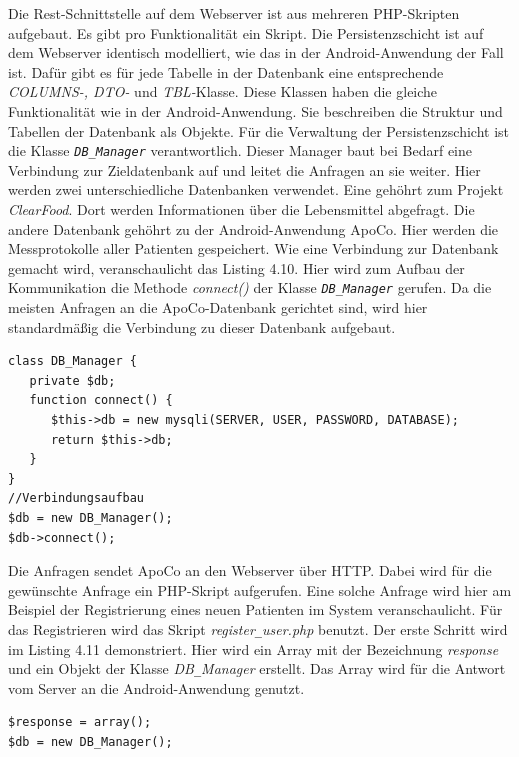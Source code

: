 Die Rest-Schnittstelle auf dem Webserver ist aus mehreren PHP-Skripten aufgebaut.
Es gibt pro Funktionalit\"at ein Skript.
Die Persistenzschicht ist auf dem Webserver identisch modelliert, wie das in der Android-Anwendung der Fall ist.
Daf\"ur gibt es f\"ur jede Tabelle in der Datenbank eine entsprechende \emph{COLUMNS-, DTO-} und \emph{TBL-}Klasse.
Diese Klassen haben die gleiche Funktionalit\"at wie in der Android-Anwendung.
Sie beschreiben die Struktur und Tabellen der Datenbank als Objekte.
F\"ur die Verwaltung der Persistenzschicht ist die Klasse \emph{\texttt{DB\_Manager}} verantwortlich.
Dieser Manager baut bei Bedarf eine Verbindung zur Zieldatenbank auf und leitet die Anfragen an sie weiter.
Hier werden zwei unterschiedliche Datenbanken verwendet.
Eine geh\"ohrt zum Projekt \emph{ClearFood}.
Dort werden Informationen \"uber die Lebensmittel abgefragt.
Die andere Datenbank geh\"ohrt zu der Android-Anwendung ApoCo.
Hier werden die Messprotokolle aller Patienten gespeichert.
Wie eine Verbindung zur Datenbank gemacht wird, veranschaulicht das Listing 4.10.
Hier wird zum Aufbau der Kommunikation die Methode \emph{connect()} der Klasse \emph{\texttt{DB\_Manager}} gerufen.
Da die meisten Anfragen an die ApoCo-Datenbank gerichtet sind, 
wird hier standardm\"a\ss{}ig die Verbindung zu dieser Datenbank aufgebaut.\\

\begin{lstlisting}[caption={Verbindungsaufbau zur Datenbank}]
class DB_Manager {   
   private $db;   
   function connect() {
      $this->db = new mysqli(SERVER, USER, PASSWORD, DATABASE);
      return $this->db;
   }
}
//Verbindungsaufbau
$db = new DB_Manager();
$db->connect();
\end{lstlisting}

Die Anfragen sendet ApoCo an den Webserver \"uber HTTP.
Dabei wird f\"ur die gew\"unschte Anfrage ein PHP-Skript aufgerufen.
Eine solche Anfrage wird hier am Beispiel der Registrierung eines neuen Patienten im System veranschaulicht.
F\"ur das Registrieren wird das Skript \emph{register\texttt{\_}user.php} benutzt.
Der erste Schritt wird im Listing 4.11 demonstriert. 
Hier wird ein Array mit der Bezeichnung \emph{response} und ein Objekt der 
Klasse \emph{DB\texttt{\_}Manager} erstellt.
Das Array wird f\"ur die Antwort vom Server an die Android-Anwendung genutzt.\\

\begin{lstlisting}[caption={Benuzter registrieren, Schritt 1}]
$response = array();
$db = new DB_Manager();
\end{lstlisting}

